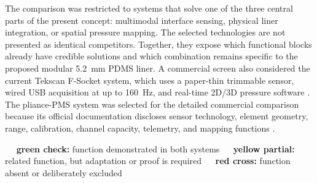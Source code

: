 
\providecommand{\qyes}{%
  \colorbox{AUBGreen}{\textcolor{white}{\bfseries\ensuremath{\checkmark}}}}
\providecommand{\qpartial}{%
  \colorbox{AUBYellow}{\textcolor{white}{\bfseries\ensuremath{\sim}}}}
\providecommand{\qgap}{%
  \colorbox{AUBCoral}{\textcolor{white}{\bfseries\ensuremath{\times}}}}

\clearpage
\hypertarget{q6-overview}{}


{\fontsize{9.15}{10.75}\selectfont
The comparison was restricted to systems that solve one of the three central
parts of the present concept: multimodal interface sensing, physical liner
integration, or spatial pressure mapping. The selected technologies are not
presented as identical competitors. Together, they expose which functional
blocks already have credible solutions and which combination remains specific
to the proposed modular 5.2~mm PDMS liner. A commercial screen also considered
the current Tekscan F-Socket system, which uses a paper-thin trimmable sensor,
wired USB acquisition at up to 160~Hz, and real-time 2D/3D pressure software
\cite{tekscanfsocket2026}. The pliance-PMS system was selected for the detailed
commercial comparison because its official documentation discloses sensor
technology, element geometry, range, calibration, channel capacity, telemetry,
and mapping functions \cite{novelpliance2019}.\par}

\vspace{0.45em}
\begin{center}
{\fontsize{7.3}{8.45}\selectfont
\qyes\ \textbf{green check:} function demonstrated in both systems\qquad
\qpartial\ \textbf{yellow partial:} related function, but adaptation or proof is required\qquad
\qgap\ \textbf{red cross:} function absent or deliberately excluded}
\end{center}

